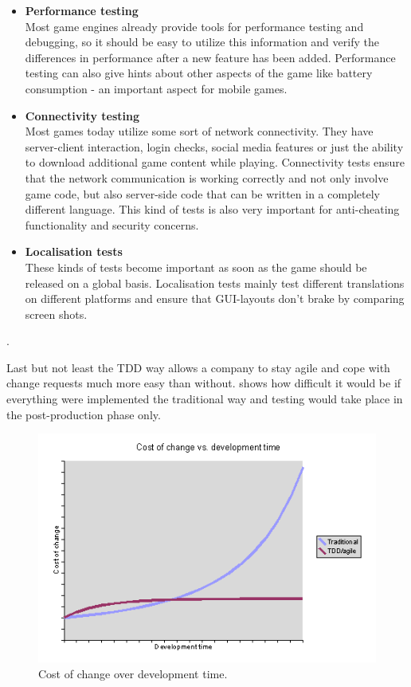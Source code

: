\begin{itemize}
            \item \textbf{Performance testing} \\
                    Most game engines already provide tools for performance testing and debugging, so it should be
                    easy to utilize this information and verify the differences in performance after a new feature has been added.
                    Performance testing can also give hints about other aspects of the game like battery consumption - an important aspect for mobile games.
            \item \textbf{Connectivity testing} \\
                    Most games today utilize some sort of network connectivity. They have server-client interaction, login checks,
                    social media features or just the ability to download additional game content while playing.
                    Connectivity tests ensure that the network communication is working correctly and not only involve game code, but also
                    server-side code that can be written in a completely different language. 
                    This kind of tests is also very important for anti-cheating functionality and security concerns.
            \item \textbf{Localisation tests} \\
                    These kinds of tests become important as soon as the game should be released on a global basis.
                    Localisation tests mainly test different translations on different platforms and ensure that GUI-layouts don't brake by comparing screen shots.
        \end{itemize}
        \cite[]{testdroid:agileProcess}.

        Last but not least the TDD way allows a company to stay agile and cope with change requests much more easy than without. 
         shows how difficult it would be if everything were implemented the traditional way and testing would take place in the post-production phase only.
        \begin{figure}[hbtp]
            \centering
            \includegraphics[width=0.95\columnwidth]{img/costofchange.png}
            \caption{Cost of change over development time.}
            \label{fig:CostOfChange}
        \end{figure}

